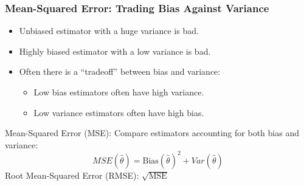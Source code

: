 \begin{frame}
\frametitle{Mean-Squared Error: Trading Bias Against Variance}



  \begin{itemize}
      \item Unbiased estimator with a huge variance is bad.
      \item Highly biased estimator with a low variance is bad.
      \item Often there is a ``tradeoff'' between bias and variance:
        \begin{itemize}
          \item Low bias estimators often have high variance.
          \item Low variance estimators often have high bias.
        \end{itemize}
  \end{itemize}

\pause

\begin{block}{Mean-Squared Error (MSE):}
Compare estimators accounting for \alert{both} bias and variance:
\[MSE(\widehat{\theta}) = \mbox{Bias}(\widehat{\theta})^2 + Var(\widehat{\theta})\]
\pause
\alert{Root Mean-Squared Error (RMSE):} $\sqrt{\mbox{MSE}}$  
\end{block}


\end{frame}
